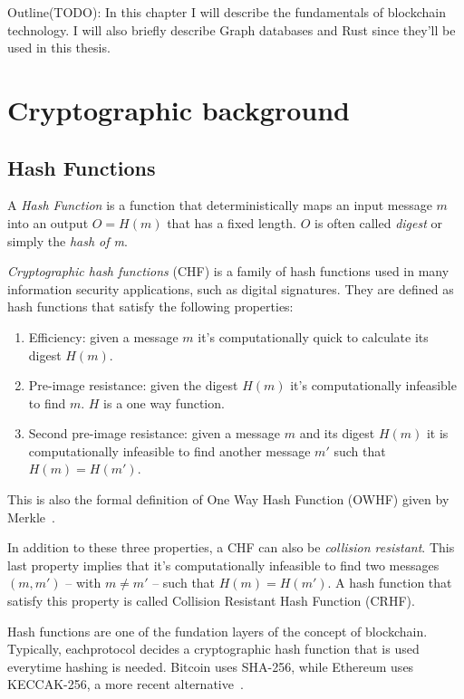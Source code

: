 
Outline(TODO): In this chapter I will describe the fundamentals of blockchain technology. I will also briefly describe Graph databases and Rust since they'll be used in this thesis.

\section{Cryptographic background}

\subsection{Hash Functions}

A \textit{Hash Function} is a function that deterministically maps an input message $m$ into an output $O=H(m)$ that has a fixed length. $O$ is often called \textit{digest} or simply the \textit{hash of m}.\

\textit{Cryptographic hash functions} (CHF) is a family of hash functions used in many information security applications, such as digital signatures. They are defined as hash functions that satisfy the following properties:

\begin{enumerate}
    \item Efficiency: given a message $m$ it's computationally quick to calculate its digest $H(m)$.
    \item Pre-image resistance: given the digest $H(m)$ it's computationally infeasible to find $m$. $H$ is a one way function.
    \item Second pre-image resistance: given a message $m$ and its digest $H(m)$ it is computationally infeasible to find another message $m'$ such that $H(m)=H(m')$.
\end{enumerate}

This is also the formal definition of One Way Hash Function (OWHF) given by Merkle~\cite{chf}. \

In addition to these three properties, a CHF can also be \textit{collision resistant}. This last property implies that it's computationally infeasible to find two messages $(m,m')$ -- with $m\neq m'$ -- such that $H(m)=H(m')$. A hash function that satisfy this property is called Collision Resistant Hash Function (CRHF).

Hash functions are one of the fundation layers of the concept of blockchain. Typically, eachprotocol decides a cryptographic hash function that is used everytime hashing is needed. Bitcoin uses SHA-256, while Ethereum uses KECCAK-256, a more recent alternative~\cite{bitcoin,Ethereum}.

